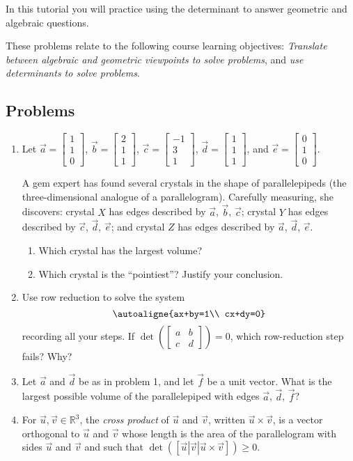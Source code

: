 \documentclass[red]{tutorial}
\newcommand{\R}{\mathbb{R}}
\newcommand{\mat}[1]{\begin{bmatrix}#1\end{bmatrix}}
\theoremstyle{definition}
\theoremstyle{theorem}
\begin{document}
	\begin{tutorial}

	\begin{objectives}
	In this tutorial you will practice using the determinant to answer geometric and algebraic questions.

	These problems relate to the following course learning objectives:
	\textit{Translate between algebraic and geometric viewpoints to solve problems}, and
		\textit{use determinants to solve problems}.
	\end{objectives}

	\subsection*{Problems}

	\begin{enumerate}
		\item Let $\vec a=\mat{1\\1\\0}$, $\vec b=\mat{2\\1\\1}$, $\vec c=\mat{-1\\3\\1}$,
			$\vec d=\mat{1\\1\\1}$, and $\vec e=\mat{0\\1\\0}$.

			A gem expert has found several crystals in the shape of parallelepipeds (the three-dimensional
			analogue of a parallelogram). Carefully measuring, she discovers:
			crystal $X$ has edges described by $\vec a$, $\vec b$, $\vec c$; crystal $Y$ has edges described by
			$\vec c$, $\vec d$, $\vec e$;
			and crystal $Z$ has edges described by $\vec a$, $\vec d$, $\vec e$.
			\begin{enumerate}
				\item Which crystal has the largest volume?
				\item Which crystal is the ``pointiest''? Justify your conclusion.
			\end{enumerate}
		\item Use row reduction to solve the system
			\[
				\autoaligne{ax+by=1\\ cx+dy=0}
			\]
			recording all your steps. If $\det\left(\mat{a&b\\c&d}\right)=0$, which row-reduction
			step fails? Why?
		\item Let $\vec a$ and $\vec d$ be as in problem 1, and let $\vec f$ be a unit vector.
			What is the largest possible volume of the parallelepiped with edges $\vec a$, $\vec d$, $\vec f$?
		\item For $\vec u,\vec v\in \R^3$, the \emph{cross product} of $\vec u$ and $\vec v$, written $\vec u\times \vec v$,
			is a vector orthogonal to $\vec u$ and $\vec v$ whose length is the area of the parallelogram
			with sides $\vec u$ and $\vec v$ and such that $\det([\vec u|\vec v|\vec u\times \vec v]) \geq  0$.


\end{enumerate}
\end{tutorial}
\end{document}
